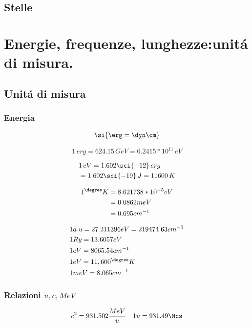 \documentclass[oneside,12pt,fleqn]{memoir}
\begin{document}
\section{Stelle}


\chapter{Energie, frequenze, lunghezze:unit\'a di misura.}
\PartialToc

\section{Unit\'a di misura}

\subsection{Energia}

\begin{align*}
\si{\erg=\dyn\cm}
\end{align*}

\begin{equation*}
1\,erg = 624.15\,GeV = 6.2415*10^{11}\, eV
\end{equation*}

\begin{align*}
&1\,eV=1.602\sci{-12}\,erg\\
&=1.602\sci{-19}\,J=11600\,K\\
\end{align*}

\begin{align*}
1  ^{\degree}K&= 8.621738*10^{-5}  eV \\
&= 0.0862 meV \\
&= 0.695 cm^{-1}
\end{align*}

\begin{align*}
&1 a.u=27.211396 eV=219474.63 cm^{-1}\\
&1 Ry=13.6057 eV \\
&1 eV =8065.54 cm^{-1} \\
&1 eV= 11,600  ^{\degree}K\\
&1 meV = 8.065 cm^{-1}
\end{align*}

\subsection{Relazioni $u,c,MeV$}
 
\begin{align*}
&c^2=931.502\frac{MeV}{u}
&1 u=931.49 \Mcs
\end{align*}
 
\end{document}
